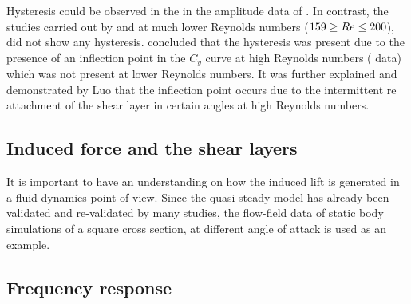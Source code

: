 Hysteresis could be observed in the in the amplitude data of \cite{Parkinson1964}. In contrast, the studies carried out by \citet{Barrero-Gil2009} and \citet{Joly2012} at much lower Reynolds numbers ($159\geq Re\leq 200$), did not show any hysteresis. \citet{Luo2003} concluded that the hysteresis was present due to the presence of an inflection point in the $C_y$ curve at high Reynolds numbers (\citet{Parkinson1964} data) which was not present at lower Reynolds numbers. It was further explained and demonstrated by Luo that the inflection point occurs due to the intermittent re attachment of the shear layer in certain angles at high Reynolds numbers. 





\subsection{Induced force and the shear layers}

It is important to have an understanding on how the induced lift is generated in a fluid dynamics point of view. Since the quasi-steady model has already been validated and re-validated by many studies, the flow-field data of static body simulations of a square cross section, at different angle of attack is used as an example. 


\subsection{Frequency response}






















  


    

     











